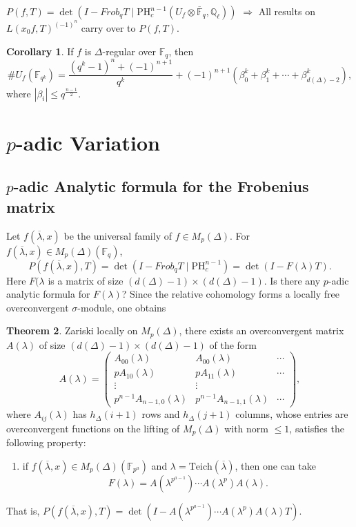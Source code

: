 \documentclass[a4paper,oneside,11pt]{article}
\theoremstyle{plain} \theoremstyle{definition}
\newtheorem{Thm}{Theorem}[section]
\newtheorem{Cor}[Thm]{Corollary}
\theoremstyle{remark}
\newcommand{\Q}{\mathbb{Q}}
\newcommand{\f}{\mathbb{F}}
\begin{document}
\hskip 7mm$P(f,T)=\det(I-Frob_q T\mid \text{PH}_c^{n-1}(U_f\otimes \overline{\f}_q,\Q_\ell))$
\vskip 1mm $\Longrightarrow$ All results on $L(x_0f,T)^{(-1)^n}$
carry over to $P(f,T)$.
\begin{Cor}If $f$ is $\Delta$-regular over $\f_q$, then $$
\#U_f(\f_{q^k})=\frac{(q^k-1)^n+(-1)^{n+1}}{q^k}+(-1)^{n+1}(\beta_0^k
+\beta_1^k+\cdots+\beta_{d(\Delta)-2}^k),$$where $|\beta_i|\le
q^{\frac{n-1}{2}}$.\end{Cor}

\section{$p$-adic Variation}

\subsection{$p$-adic Analytic formula for the Frobenius matrix}

Let $f(\overline{\lambda},x)$ be the universal family of $f\in
M_p(\Delta)$. For $f(\overline{\lambda},x)\in M_p(\Delta)(\f_q)$,
$$P({f(\overline{\lambda},x)}, T)=\det (I-Frob_qT\mid
\text{PH}_c^{n-1})=\det(I-F(\lambda)T).$$ Here $F(\lambda$ is a matrix of size
$(d(\Delta)-1)\times (d(\Delta)-1)$. Is there any $p$-adic analytic formula for
$F(\lambda)$? Since the relative cohomology forms a locally free overconvergent 
$\sigma$-module, one obtains 

\begin{Thm} Zariski locally on $M_p(\Delta)$, there
exists an overconvergent 
matrix $A(\lambda)$ of size $(d(\Delta)-1)\times (d(\Delta)-1)$ of the form
$$A(\lambda)=\begin{pmatrix}A_{00}(\lambda)&A_{00}(\lambda)&\cdots\\
pA_{10}(\lambda)&pA_{11}(\lambda)&\cdots\\
\vdots&\vdots& \\
p^{n-1}A_{n-1,0}(\lambda)&p^{n-1}A_{n-1,1}(\lambda)&\cdots\end{pmatrix},$$
where  $A_{ij}(\lambda)$ has $h_\Delta(i+1)$ rows and
$h_\Delta(j+1)$ columns, whose entries are overconvergent functions
on the lifting of $M_p(\Delta)$ with norm $\le 1$, satisfies the
following property:

\begin{enumerate}\item[]if $f(\overline{\lambda},x)\in
M_p(\Delta)(\f_{p^a})$ and
$\lambda=\text{Teich}(\overline{\lambda})$, then one can take
$$F(\lambda)=A(\lambda^{p^{a-1}})\cdots A(\lambda^p)A(\lambda).$$
\end{enumerate}
That is,
$P(f(\overline{\lambda},x),T)=\det(I-A(\lambda^{p^{a-1}})\cdots
A(\lambda^p)A(\lambda)T)$.\end{Thm}
\end{document}
